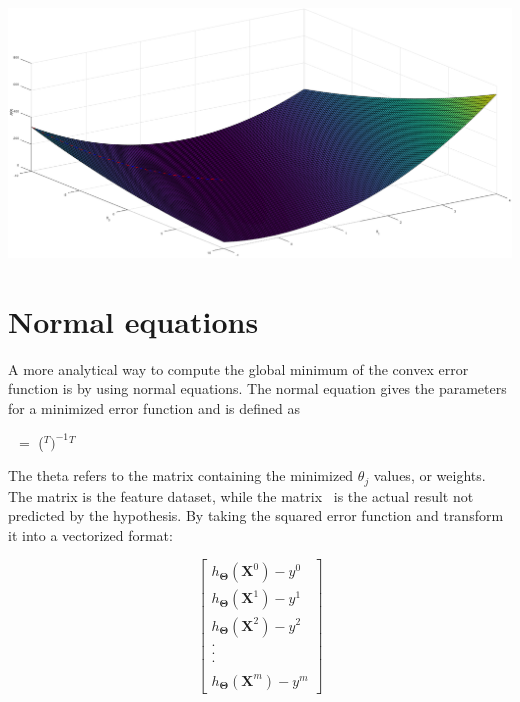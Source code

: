 \documentclass[a4paper,12pt]{article}
\begin{document}
\\
\includegraphics[scale=0.38]{gradientdescent}

\section{Normal equations}
A more analytical way to compute the global minimum of the convex error function is by using normal equations. The normal equation gives the parameters for a minimized error function and is defined as
\begin{center}
\boldmath{$\Theta $}\unboldmath \ $=$ (\unboldmath$^T$\unboldmath$)^{-1}$\unboldmath$^T$\unboldmath
\end{center}
The theta refers to the matrix containing the minimized \(\theta_j\) values, or weights. The matrix \unboldmath is the feature dataset, while the matrix \unboldmath \ is the actual result not predicted by the hypothesis. By taking the squared error function and transform it into a vectorized format:

\[\begin{bmatrix} h_{\boldsymbol{\Theta}} (\boldsymbol{X}^0) - y^0 \\ h_{\boldsymbol{\Theta}} (\boldsymbol{X}^1) - y^1 \\ h_{\boldsymbol{\Theta}} (\boldsymbol{X}^2) - y^2 \\ . \\ . \\ . \\  \\ h_{\boldsymbol{\Theta}} (\boldsymbol{X}^m) - y^m\end{bmatrix}\]
\end{document}

